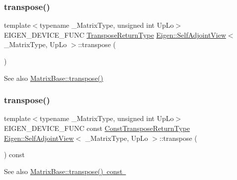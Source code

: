 \subsubsection{\texorpdfstring{transpose()}{transpose()}\hspace{0.1cm}{\footnotesize\ttfamily [1/2]}}
{\footnotesize\ttfamily template$<$typename \+\_\+\+Matrix\+Type, unsigned int Up\+Lo$>$ \\
E\+I\+G\+E\+N\+\_\+\+D\+E\+V\+I\+C\+E\+\_\+\+F\+U\+NC \mbox{\hyperlink{class_eigen_1_1_self_adjoint_view}{Transpose\+Return\+Type}} \mbox{\hyperlink{class_eigen_1_1_self_adjoint_view}{Eigen\+::\+Self\+Adjoint\+View}}$<$ \+\_\+\+Matrix\+Type, Up\+Lo $>$\+::transpose (\begin{DoxyParamCaption}{ }\end{DoxyParamCaption})\hspace{0.3cm}{\ttfamily [inline]}}

\begin{DoxySeeAlso}{See also}
\mbox{\hyperlink{class_eigen_1_1_dense_base_ac8952c19644a4ac7e41bea45c19b909c}{Matrix\+Base\+::transpose()}} 
\end{DoxySeeAlso}
\mbox{\label{class_eigen_1_1_self_adjoint_view_aa1304047233ca6b8c9ee87c025edccc9}} 
\subsubsection{\texorpdfstring{transpose()}{transpose()}\hspace{0.1cm}{\footnotesize\ttfamily [2/2]}}
{\footnotesize\ttfamily template$<$typename \+\_\+\+Matrix\+Type, unsigned int Up\+Lo$>$ \\
E\+I\+G\+E\+N\+\_\+\+D\+E\+V\+I\+C\+E\+\_\+\+F\+U\+NC const \mbox{\hyperlink{class_eigen_1_1_self_adjoint_view}{Const\+Transpose\+Return\+Type}} \mbox{\hyperlink{class_eigen_1_1_self_adjoint_view}{Eigen\+::\+Self\+Adjoint\+View}}$<$ \+\_\+\+Matrix\+Type, Up\+Lo $>$\+::transpose (\begin{DoxyParamCaption}{ }\end{DoxyParamCaption}) const\hspace{0.3cm}{\ttfamily [inline]}}

\begin{DoxySeeAlso}{See also}
\mbox{\hyperlink{class_eigen_1_1_dense_base_a38c0b074cf93fc194bf91141287cee3f}{Matrix\+Base\+::transpose() const }} 
\end{DoxySeeAlso}
\mbox{\label{class_eigen_1_1_self_adjoint_view_ac7b8bf0e2e4636b3d1e4f0564716bf6d}} 
